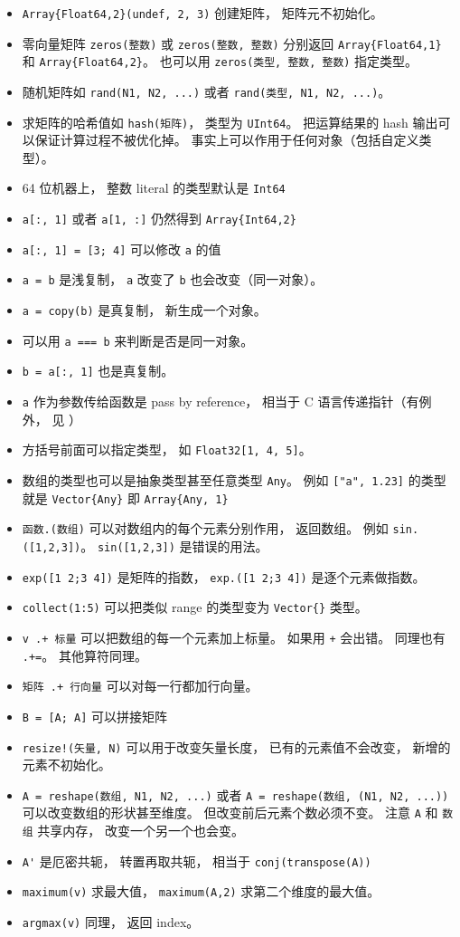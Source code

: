 \begin{itemize}
\item \verb`Array{Float64,2}(undef, 2, 3)` 创建矩阵， 矩阵元不初始化。
\item 零向量矩阵 \verb`zeros(整数)` 或 \verb`zeros(整数, 整数)` 分别返回 \verb`Array{Float64,1}` 和 \verb`Array{Float64,2}`。 也可以用 \verb`zeros(类型, 整数, 整数)` 指定类型。
\item 随机矩阵如 \verb`rand(N1, N2, ...)` 或者 \verb`rand(类型, N1, N2, ...)`。
\item 求矩阵的哈希值如 \verb`hash(矩阵)`， 类型为 \verb`UInt64`。 把运算结果的 hash 输出可以保证计算过程不被优化掉。 事实上可以作用于任何对象（包括自定义类型）。
\item 64 位机器上， 整数 literal 的类型默认是 \verb`Int64`
\item \verb`a[:, 1]` 或者 \verb`a[1, :]` 仍然得到 \verb`Array{Int64,2}`
\item \verb`a[:, 1] = [3; 4]` 可以修改 \verb`a` 的值
\item \verb`a = b` 是浅复制， \verb`a` 改变了 \verb`b` 也会改变（同一对象）。
\item \verb`a = copy(b)` 是真复制， 新生成一个对象。
\item 可以用 \verb`a === b` 来判断是否是同一对象。
\item \verb`b = a[:, 1]` 也是真复制。
\item \verb`a` 作为参数传给函数是 pass by reference， 相当于 C 语言传递指针（有例外， 见 ）
\item 方括号前面可以指定类型， 如 \verb`Float32[1, 4, 5]`。
\item 数组的类型也可以是抽象类型甚至任意类型 \verb`Any`。 例如 \verb`["a", 1.23]` 的类型就是 \verb`Vector{Any}` 即 \verb`Array{Any, 1}`
\item \verb`函数.(数组)` 可以对数组内的每个元素分别作用， 返回数组。 例如 \verb`sin.([1,2,3])`。 \verb`sin([1,2,3])` 是错误的用法。
\item \verb`exp([1 2;3 4])` 是矩阵的指数， \verb`exp.([1 2;3 4])` 是逐个元素做指数。
\item \verb`collect(1:5)` 可以把类似 range 的类型变为 \verb`Vector{}` 类型。
\item \verb`v .+ 标量` 可以把数组的每一个元素加上标量。 如果用 \verb`+` 会出错。 同理也有 \verb`.+=`。 其他算符同理。
\item \verb`矩阵 .+ 行向量` 可以对每一行都加行向量。
\item \verb`B = [A; A]` 可以拼接矩阵
\item \verb`resize!(矢量, N)` 可以用于改变矢量长度， 已有的元素值不会改变， 新增的元素不初始化。
\item \verb`A = reshape(数组, N1, N2, ...)` 或者 \verb`A = reshape(数组, (N1, N2, ...))` 可以改变数组的形状甚至维度。 但改变前后元素个数必须不变。 注意 \verb`A` 和 \verb`数组` 共享内存， 改变一个另一个也会变。
\item \verb`A'` 是厄密共轭， 转置再取共轭， 相当于 \verb`conj(transpose(A))`
\item \verb`maximum(v)` 求最大值， \verb`maximum(A,2)` 求第二个维度的最大值。
\item \verb`argmax(v)` 同理， 返回 index。
\end{itemize}

